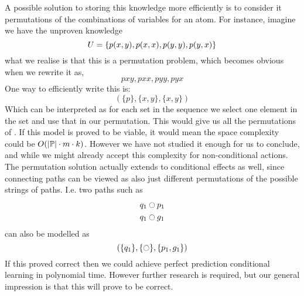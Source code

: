 \documentclass[../Master.tex]{subfiles}
\begin{document}
A possible solution to storing this knowledge more efficiently is to consider it permutations of the combinations of variables for an atom.
For instance, imagine we have the unproven knowledge
 \begin{equation*}
	U = \{ p(x,y), p(x,x), p(y,y), p(y,x) \}
 \end{equation*} 
 what we realise is that this is a permutation problem, which becomes obvious when we rewrite it as,
 \begin{equation}\label{eq:dis:sc:perms}
 	pxy, pxx, pyy, pyx 
 \end{equation} 
 One way to efficiently write this is:
  \begin{equation*}
  	(\{p\},\{x,y\},\{x,y\}) 
  \end{equation*} 
 Which can be interpreted as for each set in the sequence we select one element in the set and use that in our permutation.
 This would give us all the permutations of . 
 If this model is proved to be viable, it would mean the space complexity could be $O(|\mathbb{P}| \cdot m \cdot k)$. 
 However we have not studied it enough for us to conclude,
 and while we might already accept this complexity for non-conditional actions. 
 The permutation solution actually extends to conditional effects as well, since connecting paths can be viewed as also just different permutations of the possible strings of paths.
 I.e. two paths such as 
 \begin{align*}
	q_1 &\ocircle p_1 \\
	q_1 &\ocircle g_1
 \end{align*} 
 can also be modelled as
 \begin{equation*}
 	(\{q_1\},\{\ocircle\},\{p_1,g_1\}) 
 \end{equation*} 
If this proved correct then we could achieve perfect prediction conditional learning in polynomial time. However further research is required, but our general impression is that this will prove to be correct.
\end{document}
